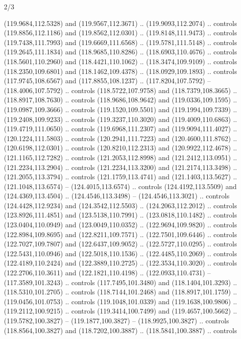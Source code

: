 \begin{flagdescription}{2/3}
\begin{scope}[shift={(0.5\flaglength,0.5)},scale=\flagwidth/320]
\begin{scope}[y=0.8pt, x=0.8pt, yscale=-1,shift={(-118.3,-146)}]
  (119.9684,112.5328) and (119.9567,112.3671) .. (119.9093,112.2074) .. controls
  (119.8856,112.1186) and (119.8562,112.0301) .. (119.8148,111.9473) .. controls
  (119.7438,111.7993) and (119.6669,111.6568) .. (119.5781,111.5148) .. controls
  (119.2645,111.1834) and (118.9685,110.8286) .. (118.6903,110.4676) .. controls
  (118.5601,110.2960) and (118.4421,110.1062) .. (118.3474,109.9109) .. controls
  (118.2350,109.6801) and (118.1462,109.4378) .. (118.0929,109.1893) .. controls
  (117.9745,108.6567) and (117.8855,108.1237) .. (117.8204,107.5792) --
  (118.4006,107.5792) .. controls (118.5722,107.9758) and (118.7379,108.3665) ..
  (118.8917,108.7630) .. controls (118.9686,108.9642) and (119.0336,109.1595) ..
  (119.0987,109.3666) .. controls (119.1520,109.5501) and (119.1994,109.7339) ..
  (119.2408,109.9233) .. controls (119.3237,110.3020) and (119.4009,110.6863) ..
  (119.4719,111.0650) .. controls (119.6968,111.2307) and (119.9094,111.4027) ..
  (120.1224,111.5803) .. controls (120.2941,111.7223) and (120.4600,111.8762) ..
  (120.6198,112.0301) .. controls (120.8210,112.2313) and (120.9922,112.4678) ..
  (121.1165,112.7282) .. controls (121.2053,112.8998) and (121.2412,113.0951) ..
  (121.2234,113.2904) .. controls (121.2234,113.3200) and (121.2174,113.3498) ..
  (121.2055,113.3794) .. controls (121.1759,113.4741) and (121.1403,113.5627) ..
  (121.1048,113.6574) -- (124.4015,113.6574) .. controls (124.4192,113.5509) and
  (124.4369,113.4504) .. (124.4546,113.3498) -- (124.4546,113.3021) .. controls
  (124.4428,112.9234) and (124.3542,112.5503) .. (124.2063,112.2012) .. controls
  (123.8926,111.4851) and (123.5138,110.7991) .. (123.0818,110.1482) .. controls
  (123.0404,110.0949) and (123.0049,110.0352) .. (122.9694,109.9820) .. controls
  (122.8984,109.8695) and (122.8211,109.7571) .. (122.7501,109.6446) .. controls
  (122.7027,109.7807) and (122.6437,109.9052) .. (122.5727,110.0295) .. controls
  (122.5431,110.0946) and (122.5018,110.1536) .. (122.4485,110.2069) .. controls
  (122.4189,110.2424) and (122.3889,110.2725) .. (122.3534,110.3020) .. controls
  (122.2706,110.3611) and (122.1821,110.4198) .. (122.0933,110.4731) --
  (117.3589,101.3243) .. controls (117.7495,101.3480) and (118.1404,101.3293) ..
  (118.5310,101.2705) .. controls (118.7144,101.2468) and (118.8917,101.1759) ..
  (119.0456,101.0753) .. controls (119.1048,101.0339) and (119.1638,100.9806) ..
  (119.2112,100.9215) .. controls (119.3414,100.7499) and (119.4657,100.5662) ..
  (119.5782,100.3827) -- (119.1877,100.3827) -- (118.9925,100.3827) .. controls
  (118.8564,100.3827) and (118.7202,100.3887) .. (118.5841,100.3887) .. controls

\end{scope}
\end{scope}
\end{flagdescription}
